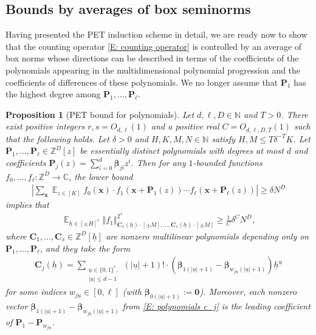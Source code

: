 \documentclass[11pt]{amsart}
\newtheorem{proposition}[lemma]{Proposition}
\theoremstyle{definition}
\DeclareMathOperator*{\E}{\mathbb{E}}
\newcommand{\C}{{\mathbb C}}
\newcommand{\N}{{\mathbb N}}
\newcommand{\Z}{{\mathbb Z}}
\newcommand{\bc}{{\mathbf{C}}}
\newcommand{\bp}{{\mathbf{P}}}
\newcommand{\p}{{\mathbf{P}}}
\newcommand{\bx}{{\mathbf{x}}}
\newcommand{\bbeta}{{\boldsymbol{\beta}}}
\newcommand{\uh}{{\underline{h}}}
\newcommand{\uu}{{\underline{u}}}
\newcommand{\norm}[1]{\left\Vert #1\right\Vert}
\newcommand{\abs}[1]{\mathopen{}\left| #1\mathclose{}\right|}
\begin{document}
    \subsection{Bounds by averages of box seminorms}\label{SS: PET bound}
    Having presented the PET induction scheme in detail, we are ready now to show that the counting operator \eqref{E: counting operator} is controlled by an average of box norms whose directions can be described in terms of the coefficients of the polynomials appearing in the multidimensional polynomial progression and the coefficients of differences of these polynomials. We no longer assume that $\p_1$ has the highest degree among $\p_1, \ldots, \p_\ell$.
\begin{proposition}[PET bound for polynomials]\label{P: PET}
			Let $d, \ell,D\in\N$ and $T>0$. There exist positive integers $r, s=O_{d, \ell}(1)$ and a positive real $C=O_{d,\ell,D,T}(1)$ such that the following holds.  Let $\delta>0$ and $H, K, M, N\in\N$ satisfy $H,M \leq T\delta^{-T}K$.  Let $\p_1, \ldots, \p_\ell\in\Z^D[z]$ be essentially distinct polynomials  with degrees at most $d$ and coefficients $\p_j(z) = \sum_{i=0}^d \bbeta_{ji} z^i$.
   Then for any $1$-bounded functions $f_0, \ldots,  f_\ell:\Z^D\to\C$, the lower bound  
			\begin{align*}%
            \abs{\sum_{\bx}\E_{z\in[K]}
            f_0(\bx)\cdot f_1(\bx+\p_1(z))\cdots f_\ell(\bx+\p_\ell(z))} \geq \delta N^D
			\end{align*}
   implies that
   \begin{align*}
       \E_{\uh\in[\pm H]^{r}}\norm{f_1}_{{\bc_1(\uh)}\cdot[\pm M], \ldots, {\bc_s(\uh)\cdot[\pm M]}}^{2^s} \geq \frac{1}{C} \delta^{C} N^D,
   \end{align*}
			where $\bc_1, \ldots, \bc_s\in\Z^D[\uh]$ are nonzero multilinear polynomials depending only on $\bp_1, \ldots, \bp_\ell$, and they take the form
			\begin{align}\label{E: polynomials c_j}
				\bc_{j}(\uh) = \sum_{\substack{\uu\in \{0,1\}^{r},\\ |\uu|\leq d-1}} (|\uu|+1)! \cdot (\bbeta_{1(|\uu|+1)}-\bbeta_{w_{j\uu}(|\uu|+1)})\uh^\uu
			\end{align}
                for some indices $w_{j\uu}\in[0,\ell]$ (with $\bbeta_{0(|\uu|+1)}:=\mathbf{0}$). Moreover, each nonzero vector $\bbeta_{1(|\uu|+1)}-\bbeta_{w_{j\uu}(|\uu|+1)}$ from \eqref{E: polynomials c_j} is the leading coefficient of $\p_1 - \p_{w_{j\uu}}$.
  \end{proposition}
\end{document}
